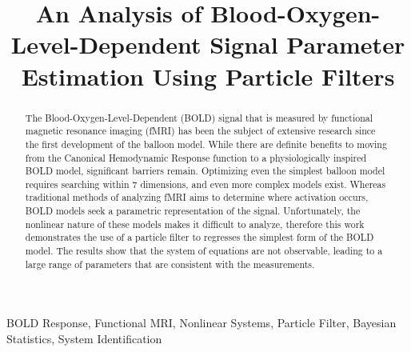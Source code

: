 \documentclass{article}
\title{An Analysis of Blood-Oxygen-Level-Dependent Signal Parameter Estimation Using Particle Filters}
\begin{document}
%
\maketitle
%
\begin{abstract}
The Blood-Oxygen-Level-Dependent (BOLD) signal that is measured by functional 
magnetic resonance imaging (fMRI)
has been the subject of extensive research since the first development 
of the balloon model. While there are definite benefits to 
moving from the Canonical Hemodynamic Response function to a physiologically inspired
BOLD model, significant barriers remain. Optimizing even the simplest
balloon model requires searching within 7 dimensions, and even more complex
models exist. Whereas traditional methods of analyzing fMRI aims
to determine where activation occurs, BOLD models seek a parametric representation
of the signal. Unfortunately, the nonlinear nature of these models
makes it difficult to analyze, therefore this work demonstrates the 
use of a particle filter to regresses the simplest form of the BOLD 
model. The results show that the system of equations are not observable,
leading to a large range of parameters that are consistent with the measurements. 
\end{abstract}
%
\begin{keywords}
BOLD Response, Functional MRI, Nonlinear Systems, Particle Filter, Bayesian Statistics, System Identification
\end{keywords}
%

\begin{acronym}[CMRO2]
\end{acronym}
\end{document}

